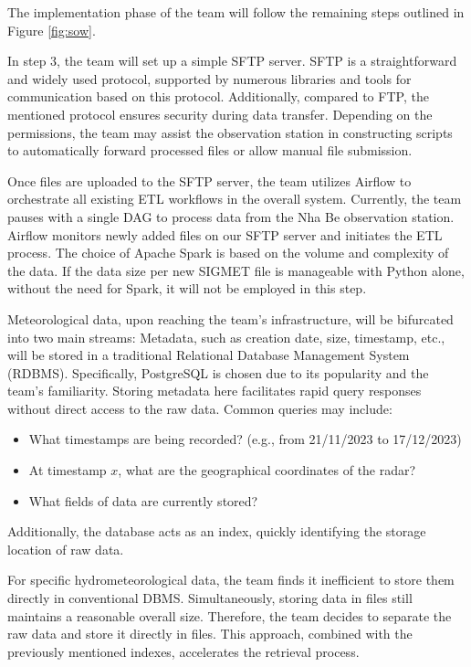 The implementation phase of the team will follow the remaining steps outlined in Figure \ref{fig:sow}.

In step 3, the team will set up a simple SFTP server. SFTP is a straightforward and widely used protocol, supported by numerous libraries and tools for communication based on this protocol. Additionally, compared to FTP, the mentioned protocol ensures security during data transfer. Depending on the permissions, the team may assist the observation station in constructing scripts to automatically forward processed files or allow manual file submission.

Once files are uploaded to the SFTP server, the team utilizes Airflow to orchestrate all existing ETL workflows in the overall system. Currently, the team pauses with a single DAG to process data from the Nha Be observation station. Airflow monitors newly added files on our SFTP server and initiates the ETL process. The choice of Apache Spark is based on the volume and complexity of the data. If the data size per new SIGMET file is manageable with Python alone, without the need for Spark, it will not be employed in this step.

Meteorological data, upon reaching the team's infrastructure, will be bifurcated into two main streams: Metadata, such as creation date, size, timestamp, etc., will be stored in a traditional Relational Database Management System (RDBMS). Specifically, PostgreSQL is chosen due to its popularity and the team's familiarity. Storing metadata here facilitates rapid query responses without direct access to the raw data. Common queries may include:

\begin{itemize}
    \item What timestamps are being recorded? (e.g., from 21/11/2023 to 17/12/2023)
    \item At timestamp $x$, what are the geographical coordinates of the radar?
    \item What fields of data are currently stored?
\end{itemize}

Additionally, the database acts as an index, quickly identifying the storage location of raw data.

For specific hydrometeorological data, the team finds it inefficient to store them directly in conventional DBMS. Simultaneously, storing data in files still maintains a reasonable overall size. Therefore, the team decides to separate the raw data and store it directly in files. This approach, combined with the previously mentioned indexes, accelerates the retrieval process.


